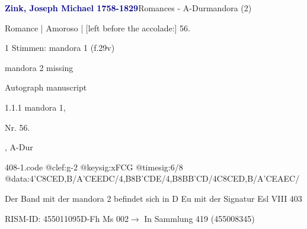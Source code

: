 \documentclass[twocolumn]{book}
\begin{document}
\par \vspace{7pt} \textcolor{darkblue}{\textbf{Zink, Joseph Michael  1758-1829}}\hfillplus{\textbf{[408]}}\newline Romances - A-Dur\newline mandora (2)
\par \begin{itshape}[f.29v, at left:] Romance | Amoroso | [left before the accolade:] 56.\end{itshape} 
\par \textcolor{darkblue}{}  1 Stimmen: mandora 1  (f.29v)\newline \begin{small} mandora 2 missing\end{small} \newline Autograph manuscript
\par 1.1.1  mandora 1, \begin{itshape}Nr. 56.\end{itshape}, A-Dur  
\begin{filecontents*}{408-1.code}
@clef:g-2
@keysig:xFCG
@timesig:6/8
@data:4'C8CED,B/A'CEEDC/4,B8B'CDE/4,B8BB'CD/4C8CED,B/A'CEAEC/
\end{filecontents*}
\newline
%
\par Der Band mit der mandora 2 befindet sich in D Eu mit der Signatur Esl VIII 403
\par RISM-ID: 455011095\newline D-Fh  Ms 002\newline $\rightarrow$ In Sammlung 419 (455008345)
      
\end{document}
